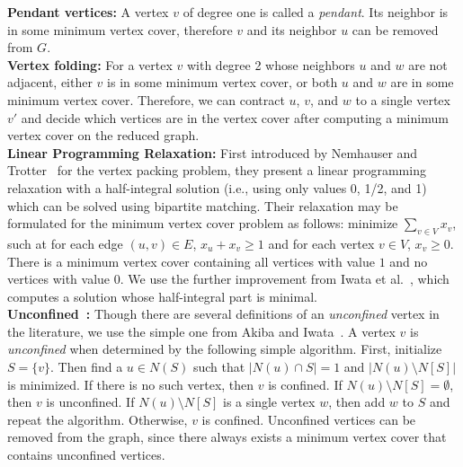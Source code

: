 \documentclass[twoside,leqno,twocolumn]{article}
\begin{document}
\noindent\textbf{Pendant vertices:} A vertex $v$ of degree one is called a \emph{pendant}. Its neighbor is in some minimum vertex cover, therefore $v$ and its neighbor $u$ can be removed from $G$. \\


\noindent\textbf{Vertex folding:} For a vertex $v$ with degree 2 whose neighbors $u$ and $w$ are not adjacent, either $v$ is in some minimum vertex cover, or both $u$ and $w$ are in some minimum vertex cover. Therefore, we can contract $u$, $v$, and $w$ to a single vertex $v'$ and decide which vertices are in the vertex cover after computing a minimum vertex cover on the reduced graph. \\

\noindent\textbf{Linear Programming Relaxation:}
First introduced by Nemhauser and Trotter~\cite{nemhauser-1975} for the vertex
packing problem, they present a linear programming relaxation with a
half-integral solution (i.e., using only values 0, 1/2, and 1) which can be
solved using bipartite matching. Their relaxation may be formulated for the
minimum vertex cover problem as follows: minimize $\sum_{v\in V}{x_v}$, such at
for each edge $(u, v) \in E$, $x_u + x_v \geq 1$ and for each vertex $v \in V$,
$x_v \geq 0$. There is a minimum vertex cover containing all vertices with value
$1$ and no vertices with value $0$. We use the further improvement from Iwata et al.~\cite{iwata-2014}, which computes a solution whose half-integral part is minimal. \\

\noindent\textbf{Unconfined~\cite{Xiao201392}:} Though there are several definitions of an \emph{unconfined} vertex in the literature, we use the simple one from Akiba and Iwata~\cite{akiba-tcs-2016}. A vertex $v$ is \emph{unconfined} when determined by the following simple algorithm. First, initialize $S = \{v\}$. Then find a $u \in N(S)$ such that $|N(u) \cap S| = 1$ and $|N(u) \setminus N[S]|$ is minimized. If there is no such vertex, then $v$ is confined. If $N(u) \setminus N[S] = \emptyset$, then $v$ is unconfined.  If $N(u)\setminus N[S]$ is a single vertex $w$, then add $w$ to $S$ and repeat the algorithm. Otherwise, $v$ is confined. Unconfined vertices can be removed from the graph, since there always exists a minimum vertex cover that contains unconfined vertices. \\
\end{document}
